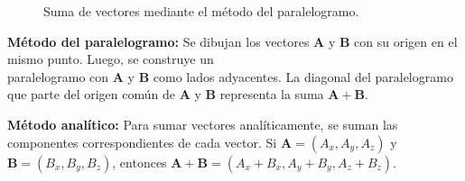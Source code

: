 \documentclass{article}
\begin{document}
\begin{wrapfigure}{r}{0.4\textwidth} %
    \centering
    \caption{Suma de vectores mediante el método del paralelogramo.}
    \label{fig:paralelogramo}
    \end{wrapfigure}
  
\textbf{Método del paralelogramo:} Se dibujan los vectores $\mathbf{A}$ y $\mathbf{B}$ con su origen en el mismo punto. Luego, se construye un \\paralelogramo con $\mathbf{A}$ y $\mathbf{B}$ como lados adyacentes. La diagonal del paralelogramo que parte del origen común de $\mathbf{A}$ y $\mathbf{B}$ representa la suma $\mathbf{A} + \mathbf{B}$. 


\textbf{Método analítico:} Para sumar vectores analíticamente, se suman las componentes correspondientes de cada vector. Si $\mathbf{A} = (A_x, A_y, A_z)$ y $\mathbf{B} = (B_x, B_y, B_z)$, entonces $\mathbf{A} + \mathbf{B} = (A_x + B_x, A_y + B_y, A_z + B_z)$.
\newpage
\end{document}
